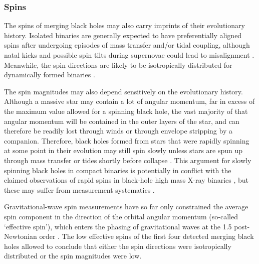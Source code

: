 \documentclass[iop,onecolumn]{revtex4}
\begin{document}
\subsubsection{Spins}
The spins of merging black holes may also carry imprints of their evolutionary history.  Isolated binaries are generally expected to have preferentially aligned spins after undergoing episodes of mass transfer and/or tidal coupling, although natal kicks and possible spin tilts during supernovae could lead to misalignment \citep[e.g.,][]{Farr:2011}.  Meanwhile, the spin directions are likely to be isotropically distributed for dynamically formed binaries \citep[e.g.,][]{Rodriguez:2016spin}.  

The spin magnitudes may also depend sensitively on the evolutionary history.  Although a massive star may contain a lot of angular momentum, far in excess of the maximum value allowed for a spinning black hole, the vast majority of that angular momentum will be contained in the outer layers of the star, and can therefore be readily lost through winds or through envelope stripping by a companion.  Therefore, black holes formed from stars that were rapidly spinning at some point in their evolution may still spin slowly unless stars are spun up through mass transfer or tides shortly before collapse \citep{Kushnir:2016,HotokezakaPiran:2017,Zaldarriaga:2017}.   This argument for slowly spinning black holes in compact binaries is potentially in conflict with the claimed observations of rapid spins in black-hole high mass X-ray binaries \citep{MillerMiller:2015}, but these may suffer from measurement systematics \citep[e.g.,][]{Kawano:2017}.  

Gravitational-wave spin measurements have so far only constrained the average spin component in the direction of the orbital angular momentum (so-called `effective spin'), which enters the phasing of gravitational waves at the 1.5 post-Newtonian order \citep{PoissonWill:1995}.  The low effective spins of the first four detected merging black holes allowed \citet{Farr:2017} to conclude that either the spin directions were isotropically distributed or the spin magnitudes were low.
\end{document}
